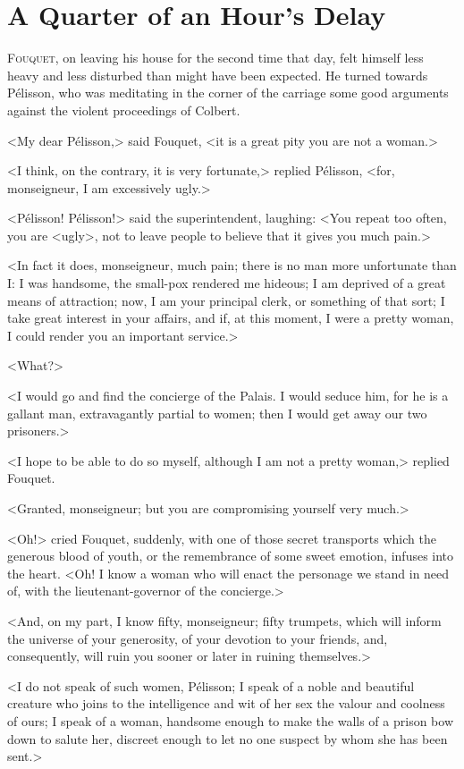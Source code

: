 \chapter{A Quarter of an Hour's Delay}

\lettrine{F}{ouquet}, on leaving his house for the second time that day, felt himself less heavy and less disturbed than might have been expected. He turned towards Pélisson, who was meditating in the corner of the carriage some good arguments against the violent proceedings of Colbert.

<My dear Pélisson,> said Fouquet, <it is a great pity you are not a woman.>

<I think, on the contrary, it is very fortunate,> replied Pélisson, <for, monseigneur, I am excessively ugly.>

<Pélisson! Pélisson!> said the superintendent, laughing: <You repeat too often, you are <ugly>, not to leave people to believe that it gives you much pain.>

<In fact it does, monseigneur, much pain; there is no man more unfortunate than I: I was handsome, the small-pox rendered me hideous; I am deprived of a great means of attraction; now, I am your principal clerk, or something of that sort; I take great interest in your affairs, and if, at this moment, I were a pretty woman, I could render you an important service.>

<What?>

<I would go and find the concierge of the Palais. I would seduce him, for he is a gallant man, extravagantly partial to women; then I would get away our two prisoners.>

<I hope to be able to do so myself, although I am not a pretty woman,> replied Fouquet.

<Granted, monseigneur; but you are compromising yourself very much.>

<Oh!> cried Fouquet, suddenly, with one of those secret transports which the generous blood of youth, or the remembrance of some sweet emotion, infuses into the heart. <Oh! I know a woman who will enact the personage we stand in need of, with the lieutenant-governor of the concierge.>

<And, on my part, I know fifty, monseigneur; fifty trumpets, which will inform the universe of your generosity, of your devotion to your friends, and, consequently, will ruin you sooner or later in ruining themselves.>

<I do not speak of such women, Pélisson; I speak of a noble and beautiful creature who joins to the intelligence and wit of her sex the valour and coolness of ours; I speak of a woman, handsome enough to make the walls of a prison bow down to salute her, discreet enough to let no one suspect by whom she has been sent.>

